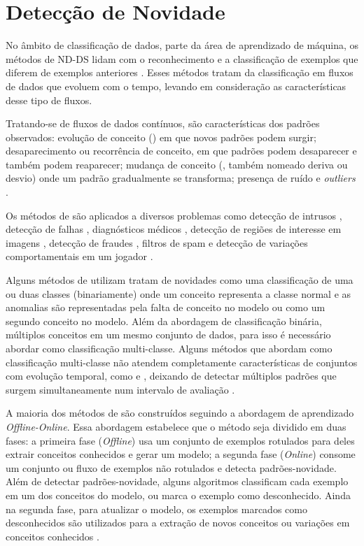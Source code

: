 \section{Detecção de Novidade}\label{sec:nd}

No âmbito de classificação de dados, parte da área de aprendizado de máquina, os
métodos de \acf{ND-DS} lidam com o reconhecimento e a classificação de exemplos
que diferem de exemplos anteriores \cite{Markou2003,Perner2009,Gama2010}.
Esses métodos tratam da classificação em fluxos de dados que evoluem com o
tempo, levando em consideração as características desse tipo de fluxos.

Tratando-se de fluxos de dados contínuos, são características
dos padrões observados:
evolução de conceito (\evolution) em que novos padrões podem surgir;
desaparecimento ou recorrência de conceito, em que padrões podem desaparecer e
também podem reaparecer;
mudança de conceito (\drift, também nomeado deriva ou desvio) onde um padrão
gradualmente se transforma;
presença de ruído e \emph{outliers} \cite{Gama2010}.

Os métodos de \nd são aplicados a diversos problemas como
detecção de intrusos \cite{Coull2003,Spinosa2008,Viegas2019,Cassales2019a},
detecção de falhas \cite{Zhang2006},
diagnósticos médicos \cite{Perner2009},
detecção de regiões de interesse em imagens \cite{singh2004approach},
detecção de fraudes \cite{wang2003mining,Abdallah201690}, 
filtros de spam \cite{Hayat2010dct} e
detecção de variações comportamentais em um jogador \cite{Vallim20136258}.

Alguns métodos de \nd utilizam tratam de novidades como uma classificação de uma
ou duas classes (binariamente) onde um conceito representa a classe normal e as anomalias
são representadas pela falta de conceito no modelo ou como um segundo conceito
no modelo.
Além da abordagem de classificação binária, múltiplos conceitos em um mesmo
conjunto de dados, para isso é necessário abordar \nd como classificação
multi-classe.
Alguns métodos que abordam \nd como classificação multi-classe não
atendem completamente características de conjuntos com 
evolução temporal,
como \evolution e \drift, deixando de detectar múltiplos padrões que surgem
simultaneamente num intervalo de avaliação \cite{Faria2016ndds,Gama2010}.

A maioria dos métodos de \nd são construídos seguindo a abordagem de aprendizado
\emph{Offline-Online}. Essa abordagem estabelece que o método seja dividido em
duas fases:
a primeira fase (\emph{Offline}) usa um conjunto de exemplos rotulados para
deles extrair conceitos conhecidos e gerar um modelo;
a segunda fase (\emph{Online}) consome um conjunto ou fluxo de exemplos não
rotulados e detecta padrões-novidade.
Além de detectar padrões-novidade, alguns algoritmos classificam cada exemplo
em um dos conceitos do modelo, ou marca o exemplo como desconhecido.
Ainda na segunda fase, para atualizar o modelo, os exemplos marcados como
desconhecidos são utilizados para a extração de novos conceitos ou variações em
conceitos conhecidos \cite{Gama2010}.

